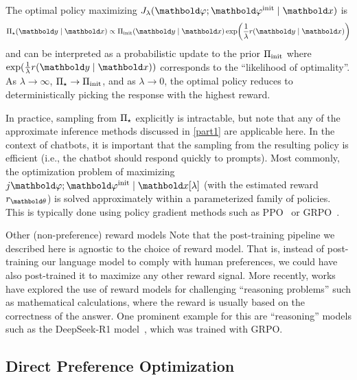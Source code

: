 The optimal policy maximizing $\j{\vvarphi; \vvarphi^{\init} \mid \vx}[\lambda]$ is  \begin{align}
  \altpi_\star(\vy \mid \vx) \propto \altpi_{\init}(\vy \mid \vx) \exp\parentheses*{\frac{1}{\lambda} r(\vy \mid \vx)} \label{eq:optimal_regularized_policy_rlhf}
\end{align} and can be interpreted as a probabilistic update to the prior $\Pi_{\mathrm{init}}$ where $\exp\parentheses{\frac{1}{\lambda} r(\vy \mid \vx)}$ corresponds to the ``likelihood of optimality''.
As $\lambda \to \infty$, $\Pi_\star \to \Pi_{\mathrm{init}}$, and as $\lambda \to 0$, the optimal policy reduces to deterministically picking the response with the highest reward.

In practice, sampling from $\Pi_\star$ explicitly is intractable, but note that any of the approximate inference methods discussed in \cref{part1} are applicable here.
In the context of chatbots, it is important that the sampling from the resulting policy is efficient (i.e., the chatbot should respond quickly to prompts).
Most commonly, the optimization problem of maximizing $j{\vvarphi; \vvarphi^{\init} \mid \vx}[\lambda]$ (with the estimated reward $r_{\vtheta}$) is solved approximately within a parameterized family of policies.
This is typically done using policy gradient methods such as PPO~\citep{stiennon2020learning} or GRPO~\citep{guo2025deepseek}.

\begin{rmk}{Other (non-preference) reward models}{}
  Note that the post-training pipeline we described here is agnostic to the choice of reward model.
  That is, instead of post-training our language model to comply with human preferences, we could have also post-trained it to maximize any other reward signal.
  More recently, works have explored the use of reward models for challenging ``reasoning problems'' such as mathematical calculations, where the reward is usually based on the correctness of the answer.
  One prominent example for this are ``reasoning'' models such as the DeepSeek-R1 model~\citep{guo2025deepseek}, which was trained with GRPO.
\end{rmk}

\subsection{Direct Preference Optimization}%

